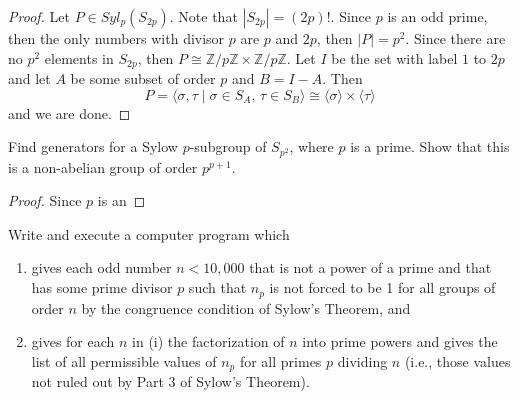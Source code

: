 \documentclass{article}
\newcommand{\Z}{\mathbb{Z}}
\newenvironment{problem}[2][Problem]{\begin{trivlist}
\item[\hskip \labelsep {\bfseries #1}\hskip \labelsep {\bfseries #2.}]}{\end{trivlist}}
\begin{document}
\begin{proof}
    Let $P\in Syl_p(S_{2p})$. Note that $|S_{2p}|=(2p)!$. Since $p$ is an odd prime, then the only numbers with divisor $p$ are $p$ and $2p$, then $|P|=p^2$. Since there are no $p^2$ elements in $S_{2p}$, then $P\cong \Z/p\Z \times \Z/p\Z$. Let $I$ be the set with label $1$ to $2p$ and let $A$ be some subset of order $p$ and $B=I-A$. Then 
    \[
        P=\langle \sigma, \tau \mid \sigma\in S_A,\, \tau \in S_B  \rangle \cong \langle \sigma \rangle \times \langle \tau \rangle
    \] and we are done.
\end{proof}
\begin{problem}{46}
        Find generators for a Sylow $p$-subgroup of $S_{p^2}$, where $p$ is a prime. Show that this is a non-abelian group of order $p^{p+1}$.
\end{problem}
\begin{proof}
    Since $p$ is an 
\end{proof}
\begin{problem}{47}
     Write and execute a computer program which
    \begin{enumerate}
        \item[(i)] gives each odd number $n < 10,000$ that is not a power of a prime and that has some prime divisor $p$ such that $n_p$ is not forced to be 1 for all groups of order $n$ by the congruence condition of Sylow's Theorem, and
        \item[(ii)] gives for each $n$ in (i) the factorization of $n$ into prime powers and gives the list of all permissible values of $n_p$ for all primes $p$ dividing $n$ (i.e., those values not ruled out by Part 3 of Sylow's Theorem).
    \end{enumerate}
\end{problem}
\end{document}
